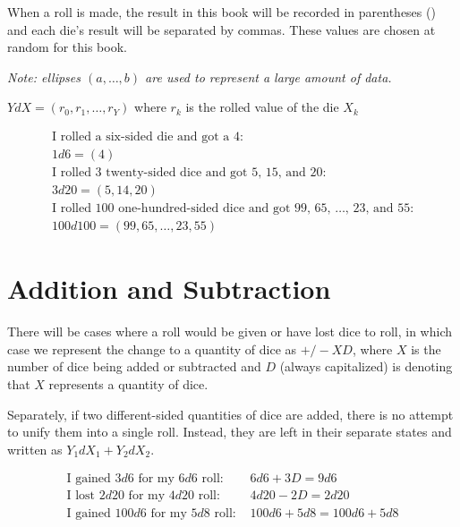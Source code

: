 \documentclass[../main.tex]{subfiles}
\begin{document}
    When a roll is made, the result in this book will be recorded in parentheses () and each die's result will be separated by commas. These values are chosen at random for this book.
    
    \emph{Note: ellipses $(a,\ldots,b)$ are used to represent a large amount of data.}
    \begin{mdframed}[style=Arrata]
        \begin{center}
            $YdX = (r_{0},r_{1},\ldots,r_{Y})$ where $r_{k}$ is the rolled value of the die $X_{k}$
        \end{center}
        \begin{equation*}
            \begin{gathered}
            \text{I rolled a six-sided die and got a 4:}                                    \\
                    1d6  = (4)                                                              \\
            \text{I rolled 3 twenty-sided dice and got 5, 15, and 20:}                      \\
                    3d20 = (5, 14, 20)                                                      \\
            \text{I rolled 100 one-hundred-sided dice and got 99, 65, \ldots, 23, and 55:}\\
                    100d100 = (99, 65, \ldots, 23, 55)                                      
            \end{gathered}
        \end{equation*}
    \end{mdframed}

    \section{Addition and Subtraction}

    There will be cases where a roll would be given or have lost dice to roll, in which case we represent the change to a quantity of dice as $+/-XD$, where $X$ is the number of dice being added or subtracted and $D$ (always capitalized) is denoting that $X$ represents a quantity of dice.

    Separately, if two different-sided quantities of dice are added, there is no attempt to unify them into a single roll. Instead, they are left in their separate states and written as $Y_{1}dX_{1} + Y_{2}dX_{2}$.
    \\
    \begin{mdframed}[style=Arrata]
        \begin{align*}
            \text{I gained $3d6$ for my $6d6$ roll: }   & 6d6 + 3D = 9d6            \\
            \text{I lost $2d20$ for my $4d20$ roll: }   & 4d20 - 2D = 2d20          \\
            \text{I gained $100d6$ for my $5d8$ roll: } & 100d6 + 5d8 = 100d6 + 5d8    
        \end{align*}
    \end{mdframed}
\end{document}
